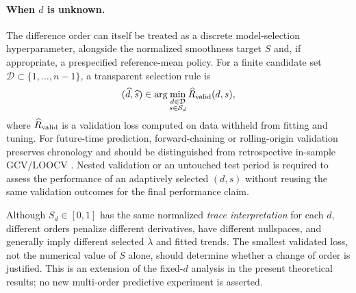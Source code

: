 \paragraph{When $d$ is unknown.}
The difference order can itself be treated as a discrete
model-selection hyperparameter, alongside the normalized
smoothness target $S$ and, if appropriate, a prespecified
reference-mean policy. For a finite candidate set
$\mathcal D\subset\{1,\ldots,n-1\}$, a transparent
selection rule is
\begin{equation}\label{eq:joint-order-selection}
(\widehat d,\widehat s)
\in\arg\min_{\substack{d\in\mathcal D\\s\in\mathcal S_d}}
\widehat R_{\rm valid}(d,s),
\end{equation}
where $\widehat R_{\rm valid}$ is a validation loss
computed on data withheld from fitting and tuning.
For future-time prediction, forward-chaining or
rolling-origin validation preserves chronology and
should be distinguished from retrospective in-sample
GCV/LOOCV \citep{tashman2000,bergmeir2018}.
Nested validation or an untouched test period is required
to assess the performance of an adaptively selected
$(d,s)$ without reusing the same validation outcomes
for the final performance claim.

Although $S_d\in[0,1]$ has the same normalized
\emph{trace interpretation} for each $d$,
different orders penalize different derivatives, have
different nullspaces, and generally imply different
selected $\lambda$ and fitted trends. The smallest
validated loss, not the numerical value of $S$
alone, should determine whether a change of order
is justified. This is an extension of the fixed-$d$
analysis in the present theoretical results; no new
multi-order predictive experiment is asserted.
